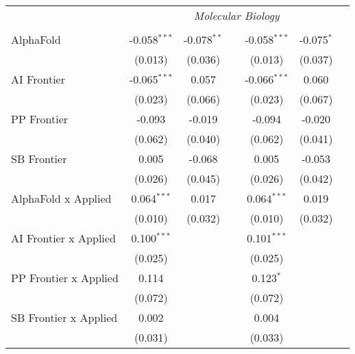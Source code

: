 \begin{tabular}{lcccccc}
 & \multicolumn{6}{c}{\textit{Molecular Biology}} \\ \\
   AlphaFold                    & -0.058$^{***}$ & -0.078$^{**}$ &                & -0.058$^{***}$ & -0.075$^{*}$ &   \\   
                                & (0.013)        & (0.036)       &                & (0.013)        & (0.037)      &   \\   
   AI Frontier                  & -0.065$^{***}$ & 0.057         &                & -0.066$^{***}$ & 0.060        &   \\   
                                & (0.023)        & (0.066)       &                & (0.023)        & (0.067)      &   \\   
   PP Frontier                  & -0.093         & -0.019        &                & -0.094         & -0.020       &   \\   
                                & (0.062)        & (0.040)       &                & (0.062)        & (0.041)      &   \\   
   SB Frontier                  & 0.005          & -0.068        &                & 0.005          & -0.053       &   \\   
                                & (0.026)        & (0.045)       &                & (0.026)        & (0.042)      &   \\   
   AlphaFold x Applied          & 0.064$^{***}$  & 0.017         &                & 0.064$^{***}$  & 0.019        &   \\   
                                & (0.010)        & (0.032)       &                & (0.010)        & (0.032)      &   \\   
   AI Frontier x Applied        & 0.100$^{***}$  &               &                & 0.101$^{***}$  &              &   \\   
                                & (0.025)        &               &                & (0.025)        &              &   \\   
   PP Frontier x Applied        & 0.114          &               &                & 0.123$^{*}$    &              &   \\   
                                & (0.072)        &               &                & (0.072)        &              &   \\   
   SB Frontier x Applied        & 0.002          &               &                & 0.004          &              &   \\   
                                & (0.031)        &               &                & (0.033)        &              &   \\   

\end{tabular}
